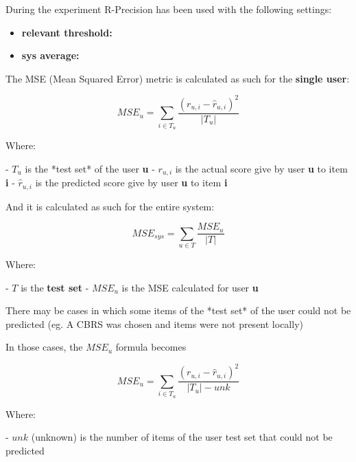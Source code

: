 \documentclass[11pt]{article}
\begin{document}
\hfill\break

During the experiment R-Precision has been used with the following settings:
\begin{itemize}
    \item \textbf{relevant threshold: }
    \item \textbf{sys average:  }
\end{itemize}





The MSE (Mean Squared Error) metric is calculated as such for the \textbf{single user}:

    \[
    MSE_u = \sum_{i \in T_u} \frac{(r_{u,i} - \hat{r}_{u,i})^2}{|T_u|}
    \]

    Where:

    - $T_u$ is the *test set* of the user \textbf{u}
    - $r_{u, i}$ is the actual score give by user \textbf{u} to item \textbf{i}
    - $\hat{r}_{u, i}$ is the predicted score give by user \textbf{u} to item \textbf{i}

\hfill\break

And it is calculated as such for the entire system:

    \[
    MSE_{sys} = \sum_{u \in T} \frac{MSE_u}{|T|}
    \]

    Where:

    - $T$ is the \textbf{test set}
    - $MSE_u$ is the MSE calculated for user \textbf{u}

\hfill\break

There may be cases in which some items of the *test set* of the user could not be predicted (eg. A CBRS was chosen
and items were not present locally)

    In those cases, the $MSE_u$ formula becomes

    \[
    MSE_u = \sum_{i \in T_u} \frac{(r_{u,i} - \hat{r}_{u,i})^2}{|T_u| - unk}
    \]

    Where:

    - $unk$ (unknown) is the number of items of the user test set that could not be predicted

\hfill\break
\end{document}
